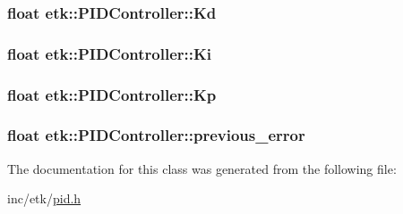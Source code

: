 \hypertarget{classetk_1_1_p_i_d_controller_a36051f342bbadb57693b941e4eb9e353}{
\subsubsection[{Kd}]{\setlength{\rightskip}{0pt plus 5cm}float etk\-::\-P\-I\-D\-Controller\-::\-Kd\hspace{0.3cm}{\ttfamily [protected]}}}\label{classetk_1_1_p_i_d_controller_a36051f342bbadb57693b941e4eb9e353}
\hypertarget{classetk_1_1_p_i_d_controller_a36cff2f631d3efb194f3e392927cb543}{
\subsubsection[{Ki}]{\setlength{\rightskip}{0pt plus 5cm}float etk\-::\-P\-I\-D\-Controller\-::\-Ki\hspace{0.3cm}{\ttfamily [protected]}}}\label{classetk_1_1_p_i_d_controller_a36cff2f631d3efb194f3e392927cb543}
\hypertarget{classetk_1_1_p_i_d_controller_ad6c1bf5a48b506990dfc8fbf47010a5c}{
\subsubsection[{Kp}]{\setlength{\rightskip}{0pt plus 5cm}float etk\-::\-P\-I\-D\-Controller\-::\-Kp\hspace{0.3cm}{\ttfamily [protected]}}}\label{classetk_1_1_p_i_d_controller_ad6c1bf5a48b506990dfc8fbf47010a5c}
\hypertarget{classetk_1_1_p_i_d_controller_a6798422061ebe557fc4a48bf7da41dff}{
\subsubsection[{previous\-\_\-error}]{\setlength{\rightskip}{0pt plus 5cm}float etk\-::\-P\-I\-D\-Controller\-::previous\-\_\-error\hspace{0.3cm}{\ttfamily [protected]}}}\label{classetk_1_1_p_i_d_controller_a6798422061ebe557fc4a48bf7da41dff}


The documentation for this class was generated from the following file\-:\begin{DoxyCompactItemize}
\item 
inc/etk/\hyperlink{pid_8h}{pid.\-h}\end{DoxyCompactItemize}
